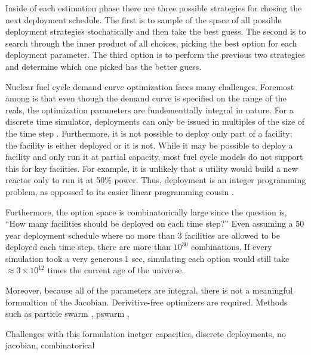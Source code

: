 Inside of each estimation phase there are three possible strategies for 
chosing the next deployment schedule.  The first is to sample of the 
space of all possible deployment strategies stochatically and then take the 
best guess.  The second is to search through the inner product of all choices,
picking the best option for each deployment parameter. The third option 
is to perform the previous two strategies and determine which one picked
has the better guess.

Nuclear fuel cycle demand curve optimization faces many challenges. 
Foremost among is that even though the demand curve is specified on the 
range of the reals, the optimization parameters are fundementtally 
integral in nature. For a discrete time simulator, deployments can only 
be issued in multiples of the size of the time step \citeme. Furthermore, 
it is not possible to deploy only part of a facility; the facility is either 
deployed or it is not. While it may be possible to deploy a facility and 
only run it at partial capacity, most fuel cycle models do not support this
for key faciities.  For example, it is unlikely that a utility would build 
a new reactor only to run it at 50\% power. Thus, deployment is an integer 
programming problem, as oppossed to its easier linear programming cousin
\citeme.

Furthermore, the option space is combinatorically large since the 
question is, ``How many facilities should be deployed on each time step?'' 
Even assuming a 50 year deployment schedule where no more than 3 facilities 
are allowed to be deployed each time step, there are more than $10^30$ 
combinations. If every simulation took a very generous 1 sec, simulating 
each option would still take $\approx 3\times10^12$ times the current age
of the universe.

Moreover, because all of the parameters are integral, there is not a 
meaningful formualtion of the Jacobian. Derivitive-free optimizers are 
required. Methods such as particle swarm \citeme, pswarm \citeme,  

Challenges with this formulation
inetger capacities, discrete deployments, no jacobian, combinatorical

